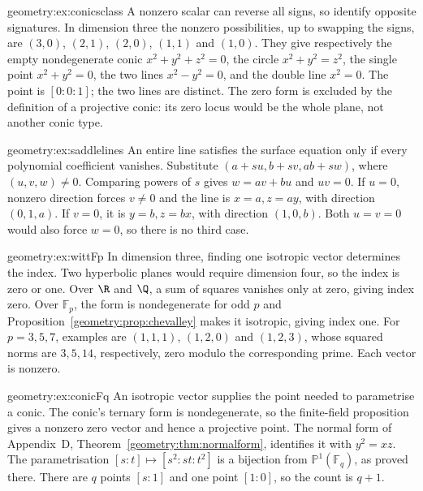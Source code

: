 \begin{solution}{geometry:ex:conicsclass}
\idea A nonzero scalar can reverse all signs, so identify opposite signatures.
\writeup In dimension three the nonzero possibilities, up to swapping
the signs, are $(3,0)$, $(2,1)$, $(2,0)$, $(1,1)$ and $(1,0)$.
They give respectively the empty nondegenerate conic
$x^2+y^2+z^2=0$, the circle $x^2+y^2=z^2$, the single point
$x^2+y^2=0$, the two lines $x^2-y^2=0$, and the double line $x^2=0$.
The point is $[0:0:1]$; the two lines are distinct.
The zero form is excluded by the definition of a projective conic:
its zero locus would be the whole plane, not another conic type.
\end{solution}
\begin{solution}{geometry:ex:saddlelines}
\idea An entire line satisfies the surface equation only if every polynomial
coefficient vanishes.
\writeup Substitute $(a+su,b+sv,ab+sw)$, where $(u,v,w)\ne0$.
Comparing powers of $s$ gives $w=av+bu$ and $uv=0$.
If $u=0$, nonzero direction forces $v\ne0$ and the line is
$x=a,z=ay$, with direction $(0,1,a)$.
If $v=0$, it is $y=b,z=bx$, with direction $(1,0,b)$.
Both $u=v=0$ would also force $w=0$, so there is no third case.
\end{solution}
\begin{solution}{geometry:ex:wittFp}
\idea In dimension three, finding one isotropic vector determines the index.
\writeup Two hyperbolic planes would require dimension four, so the
index is zero or one. Over $\R$ and $\Q$, a sum of squares vanishes
only at zero, giving index zero. Over $\mathbb F_p$, the form is
nondegenerate for odd $p$ and Proposition~\ref{geometry:prop:chevalley}
makes it isotropic, giving index one.
For $p=3,5,7$, examples are $(1,1,1)$, $(1,2,0)$ and $(1,2,3)$,
whose squared norms are $3,5,14$, respectively, zero modulo the
corresponding prime. Each vector is nonzero.
\end{solution}
\begin{solution}{geometry:ex:conicFq}
\idea An isotropic vector supplies the point needed to parametrise a conic.
\writeup The conic's ternary form is nondegenerate, so the finite-field
proposition gives a nonzero zero vector and hence a projective point.
The normal form of Appendix~D, Theorem~\ref{geometry:thm:normalform},
identifies it with $y^2=xz$. The parametrisation
$[s:t]\mapsto[s^2:st:t^2]$ is a bijection from
$\mathbb P^1(\mathbb F_q)$, as proved there.
There are $q$ points $[s:1]$ and one point $[1:0]$, so the count is $q+1$.
\end{solution}
